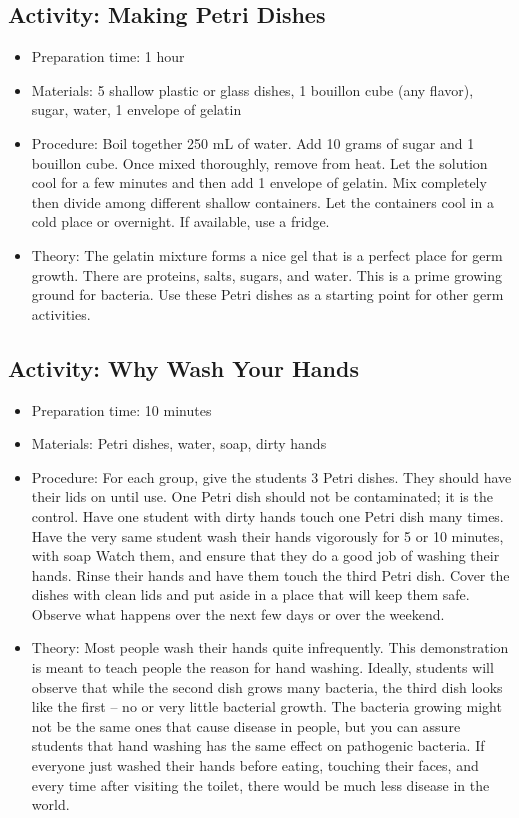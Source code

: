 \subsection{Activity: Making Petri Dishes}
\begin{itemize}
\item{Preparation time: 1 hour}
\item{Materials: 5 shallow plastic or glass dishes, 1 bouillon cube (any flavor), sugar, water, 1 envelope of gelatin}
\item{Procedure: Boil together 250 mL of water. Add 10 grams of sugar and 1 bouillon cube. Once mixed thoroughly, remove from heat. Let the solution cool for a few minutes and then add 1 envelope of gelatin. Mix completely then divide among different shallow containers. Let the containers cool in a cold place or overnight. If available, use a fridge.  }
\item{Theory: The gelatin mixture forms a nice gel that is a perfect place for germ growth. There are proteins, salts, sugars, and water. This is a prime growing ground for bacteria. Use these Petri dishes as a starting point for other germ activities.}
\end{itemize}

\subsection{Activity: Why Wash Your Hands}
\begin{itemize}
\item{Preparation time: 10 minutes}
\item{Materials: Petri dishes, water, soap, dirty hands}
\item{Procedure: For each group, give the students 3 Petri dishes. They should have their lids on until use. One Petri dish should not be contaminated; it is the control. Have one student with dirty hands touch one Petri dish many times. Have the very same student wash their hands vigorously for 5 or 10 minutes, with soap Watch them, and ensure that they do a good job of washing their hands. Rinse their hands and have them touch the third Petri dish. Cover the dishes with clean lids and put aside in a place that will keep them safe. Observe what happens over the next few days or over the weekend.}
\item{Theory: Most people wash their hands quite infrequently. This demonstration is meant to teach people the reason for hand washing. Ideally, students will observe that while the second dish grows many bacteria, the third dish looks like the first – no or very little bacterial growth. The bacteria growing might not be the same ones that cause disease in people, but you can assure students that hand washing has the same effect on pathogenic bacteria. If everyone just washed their hands before eating, touching their faces, and every time after visiting the toilet, there would be much less disease in the world.}
\end{itemize}

